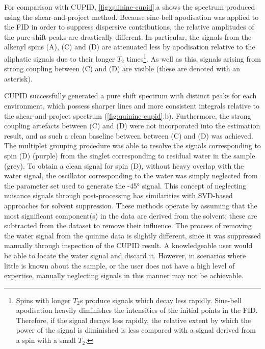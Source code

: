 For comparison with \ac{CUPID}, \cref{fig:quinine-cupid}.a shows the
spectrum produced using the shear-and-project method. Because
sine-bell apodisation was applied to the \ac{FID} in order to suppress dispersive
contributions, the relative amplitudes of the pure-shift
peaks are drastically different. In particular, the signals from the alkenyl
spins (A), (C) and (D) are attenuated less by apodisation relative to the
aliphatic signals due to their longer $T_2$ times\footnote{
    Spins with longer $T_2$s produce signals which decay less rapidly.
    Sine-bell apodisation heavily diminishes the intensities of the initial
    points in the \ac{FID}. Therefore, if the signal decays less rapidly, the
    relative extent by which the power of the signal is diminished is less
    compared with a signal derived from a spin with a small $T_2$.
}. As well as this, signals arising from strong coupling between (C) and
(D) are visible (these are denoted with an asterisk).

\ac{CUPID} successfully generated a pure shift spectrum with distinct peaks for
each  environment, which possess sharper lines and more consistent
integrals relative to the shear-and-project spectrum (\cref{fig:quinine-cupid}.b).
Furthermore, the strong coupling artefacts between (C) and (D) were not
incorporated into the estimation result, and as such a clean baseline between
between (C) and (D) was achieved.
The multiplet grouping procedure was able to resolve
the signals corresponding to spin (D) (purple) from the singlet corresponding
to residual water in the sample (grey).
To obtain a clean signal for spin (D), without heavy overlap with the water
signal, the oscillator corresponding to the water was simply neglected from
the parameter set used to generate the \ang{-45} signal. This concept of
neglecting nuisance signals through post-processing has similarities with
\ac{SVD}-based approaches for solvent suppression\cite{Zhu1997}.
These methods operate by assuming that the most significant component(s) in the
data are derived from the solvent; these are subtracted from the dataset to
remove their influence. The process of removing the water signal from the quinine
data is slightly different, since it was suppressed manually through
inspection of the \ac{CUPID} result. A knowledgeable user would be able to
locate the water signal and discard it. However, in scenarios where little is
known about the sample, or the user does not have a high level of expertise,
manually neglecting signals in this manner may not be achievable.

